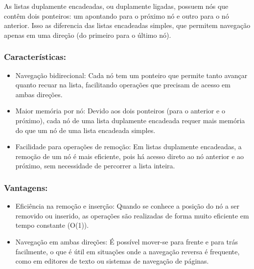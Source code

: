 \documentclass{article}
\begin{document}
As listas duplamente encadeadas, ou duplamente ligadas, possuem nós que contêm dois ponteiros: um apontando para o próximo nó e outro para o nó anterior. Isso as diferencia das listas encadeadas simples, que permitem navegação apenas em uma direção (do primeiro para o último nó).

\subsubsection{Características:}
\begin{itemize}
    \item Navegação bidirecional: Cada nó tem um ponteiro que permite tanto avançar quanto recuar na lista, facilitando operações que precisam de acesso em ambas direções.
    \item Maior memória por nó: Devido aos dois ponteiros (para o anterior e o próximo), cada nó de uma lista duplamente encadeada requer mais memória do que um nó de uma lista encadeada simples.
    \item Facilidade para operações de remoção: Em listas duplamente encadeadas, a remoção de um nó é mais eficiente, pois há acesso direto ao nó anterior e ao próximo, sem necessidade de percorrer a lista inteira.
    
\end{itemize}

\subsubsection{Vantagens:}
\begin{itemize}
    \item Eficiência na remoção e inserção: Quando se conhece a posição do nó a ser removido ou inserido, as operações são realizadas de forma muito eficiente em tempo constante (O(1)).
    \item Navegação em ambas direções: É possível mover-se para frente e para trás facilmente, o que é útil em situações onde a navegação reversa é frequente, como em editores de texto ou sistemas de navegação de páginas.  

\end{itemize}
\end{document}
